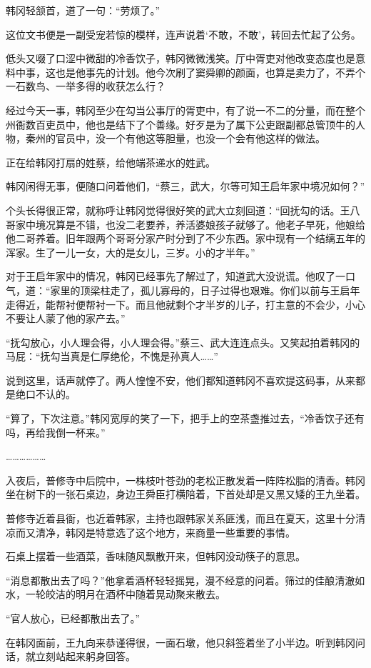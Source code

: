 韩冈轻颔首，道了一句：“劳烦了。”

这位文书便是一副受宠若惊的模样，连声说着‘不敢，不敢’，转回去忙起了公务。

低头又啜了口涩中微甜的冷香饮子，韩冈微微浅笑。厅中胥吏对他改变态度也是意料中事，这也是他事先的计划。他今次刷了窦舜卿的颜面，也算是卖力了，不弄个一石数鸟、一举多得的收获怎么行？

经过今天一事，韩冈至少在勾当公事厅的胥吏中，有了说一不二的分量，而在整个州衙数百吏员中，他也是结下了个善缘。好歹是为了属下公吏跟副都总管顶牛的人物，秦州的官员中，没一个有他这等胆量，也没一个会有他这样的做法。

正在给韩冈打扇的姓蔡，给他端茶递水的姓武。

韩冈闲得无事，便随口问着他们，“蔡三，武大，尔等可知王启年家中境况如何？”

个头长得很正常，就称呼让韩冈觉得很好笑的武大立刻回道：“回抚勾的话。王八哥家中境况算是不错，也没二老要养，养活婆娘孩子就够了。他老子早死，他娘给他二哥养着。旧年跟两个哥哥分家产时分到了不少东西。家中现有一个结缡五年的浑家。生了一儿一女，大的是女儿，三岁。小的才半年。”

对于王启年家中的情况，韩冈已经事先了解过了，知道武大没说谎。他叹了一口气，道：“家里的顶梁柱走了，孤儿寡母的，日子过得也艰难。你们以前与王启年走得近，能帮衬便帮衬一下。而且他就剩个才半岁的儿子，打主意的不会少，小心不要让人蒙了他的家产去。”

“抚勾放心，小人理会得，小人理会得。”蔡三、武大连连点头。又笑起拍着韩冈的马屁：“抚勾当真是仁厚绝伦，不愧是孙真人……”

说到这里，话声就停了。两人惶惶不安，他们都知道韩冈不喜欢提这码事，从来都是绝口不认的。

“算了，下次注意。”韩冈宽厚的笑了一下，把手上的空茶盏推过去，“冷香饮子还有吗，再给我倒一杯来。”

………………

入夜后，普修寺中后院中，一株枝叶苍劲的老松正散发着一阵阵松脂的清香。韩冈坐在树下的一张石桌边，身边王舜臣打横陪着，下首处却是又黑又矮的王九坐着。

普修寺近着县衙，也近着韩家，主持也跟韩家关系匪浅，而且在夏天，这里十分清凉而又清净，韩冈是特意选了这个地方，来商量一些重要的事情。

石桌上摆着一些酒菜，香味随风飘散开来，但韩冈没动筷子的意思。

“消息都散出去了吗？”他拿着酒杯轻轻摇晃，漫不经意的问着。筛过的佳酿清澈如水，一轮皎洁的明月在酒杯中随着晃动聚来散去。

“官人放心，已经都散出去了。”

在韩冈面前，王九向来恭谨得很，一面石墩，他只斜签着坐了小半边。听到韩冈问话，就立刻站起来躬身回答。


